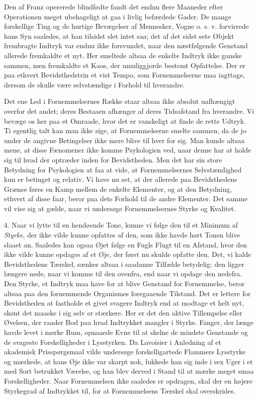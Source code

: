 \documentclass[12pt,a4paper,openany]{book}
\newcommand{\opage}[1]{\marginnote{\footnotesize\textit{[#1]}}}
\begin{document}
Den af Franz opererede blindfødte fandt det endnu flere Maaneder efter
Operationen meget ubehageligt at gaa i livlig befærdede Gader. De mange
forskellige Ting og de hurtige Bevægelser af Mennesker, Vogne o. s. v.
forvirrede hans Syn saaledes, at han tilsidst slet intet saa; det af det
sidst sete Objekt frembragte Indtryk var endnu ikke forsvundet, naar den
næstfølgende Genstand allerede fremkaldte et nyt. Her smeltede altsaa de
enkelte Indtryk ikke ganske sammen, men fremkaldte et Kaos, der
umuliggjorde bestemt Opfattelse. Der er paa ethvert Bevidsthedstrin et
vist Tempo, som Fornemmelserne maa iagttage, dersom de skulle være
selvstændige i Forhold til hverandre.

Det ene Led i Fornemmelsernes Række staar altsaa ikke absolut uafhængigt
overfor det andet; deres Bestaaen afhænger af deres Tidsafstand fra
hverandre. Vi bevæge os her paa et Omraade, hvor det er vanskeligt at
finde de rette Udtryk. Ti egentlig talt kan man ikke sige, at
Fornemmelserne smelte sammen, da de jo under de angivne Betingelser ikke
mere blive til hver for sig. Man kunde altsaa mene, at disse
\opage{130}Fænomener ikke komme Psykologien ved, naar denne har at holde
sig til hvad der optræder inden for Bevidstheden. Men det har sin store
Betydning for Psykologien at faa at vide, at Fornemmelsernes
Selvstændighed kun er betinget og relativ. Vi have nu set, at der
allerede paa Bevidsthedens Grænse føres en Kamp mellem de enkelte
Elementer, og at den Betydning, ethvert af disse faar, beror paa dets
Forhold til de andre Elementer. Det samme vil vise sig at gælde, naar vi
undersøge Fornemmelsernes Styrke og Kvalitet.

4. Naar vi lytte til en hendøende Tone, kunne vi følge den til et
Minimum af \emph{Styrke}, der ikke vilde kunne opfattes af den, som ikke
havde hørt Tonen blive slaaet an. Saaledes kan ogsaa Øjet følge en Fugls
Flugt til en Afstand, hvor den ikke vilde kunne opdages af et Øje, der
først nu skulde opfatte den. Det, vi kalde Bevidsthedens Tærskel, sænkes
altsaa i saadanne Tilfælde betydelig: den ligger længere nede, naar vi
komme til den ovenfra, end naar vi opdage den nedefra. Den Styrke, et
Indtryk maa have for at blive Genstand for Fornemmelse, beror altsaa paa
den fornemmende Organismes foregaaende Tilstand. Det er lettere for
Bevidstheden at fastholde et givet svagere Indtryk end at modtage et
helt nyt, skønt det maaske i sig selv er stærkere. Her er det den aktive
Tillempelse eller Øvelsen, der raader Bod paa hvad Indtrykket mangler i
Styrke. Fanger, der længe havde levet i mørke Rum, opnaaede Evne til at
skelne de mindste Genstande og de svageste Forskelligheder i Lysstyrken.
Da Lavoisier i Anledning af et akademisk Prisspørgsmaal vilde undersøge
forskelligartede Flammers Lysstyrke og mærkede, at hans Øje ikke var
skarpt nok, lukkede han sig inde i sex Uger i et med Sort betrukket
Værelse, og han blev derved i Stand til at mærke meget smaa
Forskelligheder. Naar Fornemmelsen ikke saaledes er opdragen, skal der
en højere Styrkegrad af Indtrykket til, for at Fornemmelsens Tærskel
skal overskrides.
\end{document}
